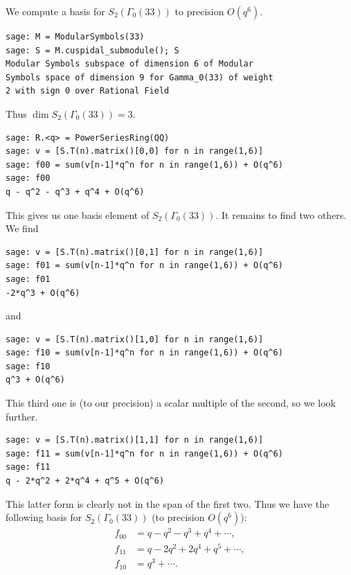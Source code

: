 \begin{example}
We compute a basis for $S_2(\Gamma_0(33))$ to precision $O(q^6)$.
\begin{verbatim}
sage: M = ModularSymbols(33)
sage: S = M.cuspidal_submodule(); S
Modular Symbols subspace of dimension 6 of Modular 
Symbols space of dimension 9 for Gamma_0(33) of weight 
2 with sign 0 over Rational Field
\end{verbatim}%

Thus $\dim S_2(\Gamma_0(33)) = 3$.
\begin{verbatim}
sage: R.<q> = PowerSeriesRing(QQ)  
sage: v = [S.T(n).matrix()[0,0] for n in range(1,6)]
sage: f00 = sum(v[n-1]*q^n for n in range(1,6)) + O(q^6)
sage: f00
q - q^2 - q^3 + q^4 + O(q^6)
\end{verbatim}%

This gives us one basis element of $S_2(\Gamma_0(33))$.  It remains
to find two others.   We find
\begin{verbatim}
sage: v = [S.T(n).matrix()[0,1] for n in range(1,6)]
sage: f01 = sum(v[n-1]*q^n for n in range(1,6)) + O(q^6)
sage: f01
-2*q^3 + O(q^6)
\end{verbatim}%

and 
\begin{verbatim}
sage: v = [S.T(n).matrix()[1,0] for n in range(1,6)]
sage: f10 = sum(v[n-1]*q^n for n in range(1,6)) + O(q^6)
sage: f10
q^3 + O(q^6)
\end{verbatim}%

This third one is (to our precision) a scalar multiple of the second,
so we look further. 
\begin{verbatim}
sage: v = [S.T(n).matrix()[1,1] for n in range(1,6)]
sage: f11 = sum(v[n-1]*q^n for n in range(1,6)) + O(q^6)
sage: f11
q - 2*q^2 + 2*q^4 + q^5 + O(q^6)
\end{verbatim}
This latter form is clearly not in the span of the first two.
Thus we have the following basis for $S_2(\Gamma_0(33))$ (to
precision $O(q^6)$):
\begin{align*}
f_{00} &= q - q^{2} - q^{3} + q^{4} + \cdots,\\
f_{11} &= q - 2q^{2} + 2q^{4} + q^{5} + \cdots,\\
f_{10} &= q^{3} + \cdots.
\end{align*}
\end{example}

